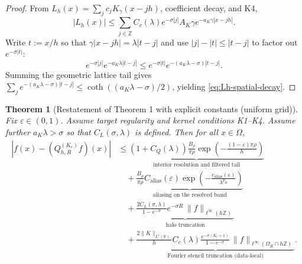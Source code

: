 \documentclass[11pt]{article}
\newtheorem{theorem}{Theorem}
\newcommand{\R}{\mathbb{R}}
\newcommand{\Z}{\mathbb{Z}}
\begin{document}
\begin{proof}
From $L_h(x)=\sum_j c_j K_\gamma(x-jh)$, coefficient decay, and K4,
\[
|L_h(x)|\le \sum_{j\in\Z} C_c(\lambda)e^{-\sigma|j|} A_K\gamma e^{-a_K\gamma|x-jh|}.
\]
Write $t:=x/h$ so that $\gamma|x-jh|=\lambda|t-j|$ and use $|j|-|t|\le |t-j|$ to factor out $e^{-\sigma|t|}$:
\[
e^{-\sigma|j|}e^{-a_K\lambda|t-j|}
\le e^{-\sigma|t|}e^{-(a_K\lambda-\sigma)|t-j|}.
\]
Summing the geometric lattice tail gives $\sum_j e^{-(a_K\lambda-\sigma)|t-j|}\le \coth((a_K\lambda-\sigma)/2)$, yielding \eqref{eq:Lh-spatial-decay}.
\end{proof}

\setcounter{theorem}{4}

\begin{theorem}[Restatement of Theorem 1 with explicit constants (uniform grid)]
\label{thm:explicit-bound}
Fix $\varepsilon\in(0,1)$. Assume target regularity and kernel conditions K1--K4. Assume further $a_K\lambda>\sigma$ so that $C_L(\sigma,\lambda)$ is defined. Then for all $x\in\Omega$,
\begin{align}
|f(x)-(Q_{h,R}^{(K_c)}f)(x)|
&\le
\underbrace{(1+C_Q(\lambda))\frac{B_\rho}{\pi\rho}\exp\!\left(-\frac{(1-\varepsilon)\pi\rho}{h}\right)}_{\text{interior resolution and filtered tail}}
\label{eq:explicit-bound-1}\\
&\quad+
\underbrace{\frac{B_\rho}{\pi\rho}C_{\mathrm{alias}}(\varepsilon)\exp\!\left(-\frac{c_{\mathrm{alias}}(\varepsilon)}{\lambda^{p_K}}\right)}_{\text{aliasing on the resolved band}}
\label{eq:explicit-bound-2}\\
&\quad+
\underbrace{\frac{2C_L(\sigma,\lambda)}{1-e^{-\sigma}}e^{-\sigma R}\,\|f\|_{\ell^\infty(h\Z)}}_{\text{halo truncation}}
\label{eq:explicit-bound-3}\\
&\quad+
\underbrace{\frac{2\|K\|_{L^1(\R)}}{h}C_c(\lambda)\frac{e^{-\sigma(K_c+1)}}{1-e^{-\sigma}}\,\|f\|_{\ell^\infty(\Omega_R\cap h\Z)}}_{\text{Fourier stencil truncation (data-local)}}.
\label{eq:explicit-bound-4}
\end{align}
\end{theorem}
\end{document}
